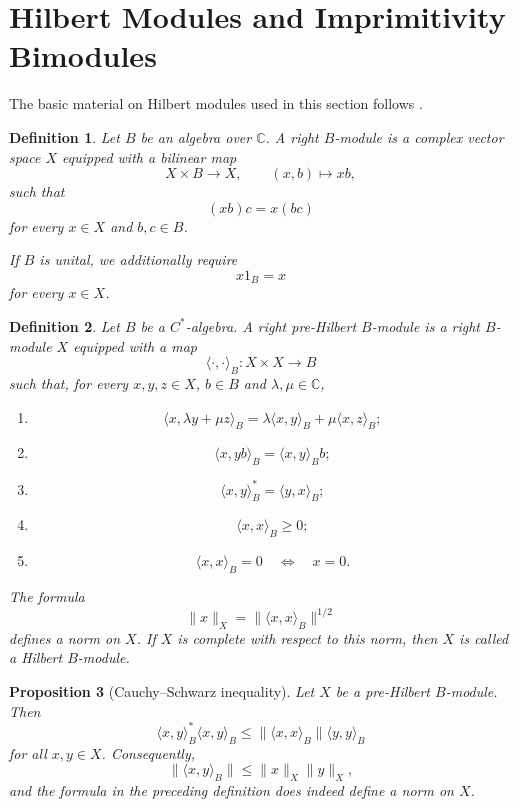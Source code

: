 \documentclass{book}
\newtheorem{definition}{Definition}[section]
\newtheorem{proposition}[definition]{Proposition}
\def\cstar{\(C^*\)-algebra}
\begin{document}
\section{Hilbert Modules and Imprimitivity Bimodules}
The basic material on Hilbert modules used in this section follows
\cite[Sections~13.1--13.2]{Blackadar1998}.
\begin{definition}
Let \(B\) be an algebra over \(\mathbb C\). A
\textnormal{right \(B\)-module} is a complex vector space \(X\)
equipped with a bilinear map
\[
  X\times B\longrightarrow X,
  \qquad
  (x,b)\longmapsto xb,
\]
such that
\[
  (xb)c=x(bc)
\]
for every \(x\in X\) and \(b,c\in B\).

If \(B\) is unital, we additionally require
\[
  x1_B=x
\]
for every \(x\in X\).
\end{definition}
\begin{definition}
Let \(B\) be a \cstar. A \textnormal{right pre-Hilbert
\(B\)-module} is a right \(B\)-module \(X\) equipped with a map
\[
  \langle\cdot,\cdot\rangle_B:X\times X\longrightarrow B
\]
such that, for every \(x,y,z\in X\), \(b\in B\) and
\(\lambda,\mu\in\mathbb C\),
\begin{enumerate}
  \item
  \[
    \langle x,\lambda y+\mu z\rangle_B
    =
    \lambda\langle x,y\rangle_B
    +
    \mu\langle x,z\rangle_B;
  \]
  \item
  \[
    \langle x,yb\rangle_B
    =
    \langle x,y\rangle_Bb;
  \]
  \item
  \[
    \langle x,y\rangle_B^*
    =
    \langle y,x\rangle_B;
  \]
  \item
  \[
    \langle x,x\rangle_B\geq0;
  \]
  \item
  \[
    \langle x,x\rangle_B=0
    \quad\Longleftrightarrow\quad
    x=0.
  \]
\end{enumerate}
The formula
\[
  \|x\|_X
  =
  \|\langle x,x\rangle_B\|^{1/2}
\]
defines a norm on \(X\). If \(X\) is complete with respect to this
norm, then \(X\) is called a \textnormal{Hilbert \(B\)-module}.
\end{definition}
\begin{proposition}[Cauchy--Schwarz inequality]
  \label{prop:HilbertModuleCS}
  Let \(X\) be a pre-Hilbert \(B\)-module. Then
  \[
    \langle x,y\rangle_B^*\langle x,y\rangle_B
    \leq
    \|\langle x,x\rangle_B\|\langle y,y\rangle_B
  \]
  for all \(x,y\in X\). Consequently,
  \[
    \|\langle x,y\rangle_B\|
    \leq
    \|x\|_X\|y\|_X,
  \]
  and the formula in the preceding definition does indeed define a norm on \(X\).
\end{proposition}
\end{document}
